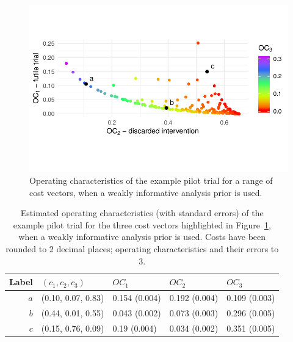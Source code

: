\documentclass{article} %
\begin{document}
\begin{figure}
\centering
\includegraphics[scale=0.8]{./Figures/p_front}
\caption{Operating characteristics of the example pilot trial for a range of cost vectors, when a weakly informative analysis prior is used.}
\label{fig:p_front}
\end{figure}

\begin{table}
\begin{tabular}{r l l l l}
\toprule
Label & $(c_{1}, c_{2}, c_{3})$ & $OC_{1}$ & $OC_{2}$ & $OC_{3}$ \\
\midrule
$a$ & (0.10, 0.07, 0.83) & 0.154 (0.004) & 0.192 (0.004) & 0.109 (0.003) \\
$b$ & (0.44, 0.01, 0.55) & 0.043 (0.002) & 0.073 (0.003) & 0.296 (0.005) \\
$c$ & (0.15, 0.76, 0.09) & 0.19 (0.004) & 0.034 (0.002) & 0.351 (0.005) \\
\bottomrule
\end{tabular}
\caption{Estimated operating characteristics (with standard errors) of the example pilot trial for the three cost vectors highlighted in Figure~\ref{fig:p_front}, when a weakly informative analysis prior is used. Costs have been rounded to 2 decimal places; operating characteristics and their errors to 3.}
\label{tab:costs}
\end{table}
\end{document}

